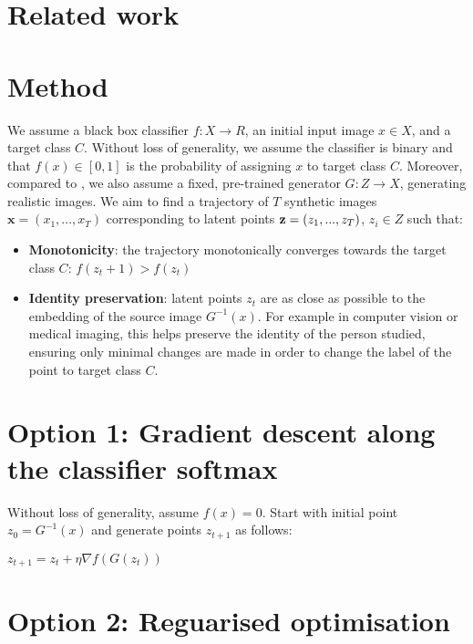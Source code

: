 \documentclass{article}
\begin{document}
\section{Related work}

% 
% 

\section{Method}


We assume a black box classifier $f: X \to R$, an initial input image $x \in X$, and a target class $C$. Without loss of generality, we assume the classifier is binary and that $f(x) \in [0,1]$ is the probability of assigning $x$ to target class $C$. Moreover, compared to \cite{singla2019explanation}, we also assume a fixed, pre-trained generator $G: Z \to X$, generating realistic images. We aim to find a trajectory of $T$ synthetic images $\textbf{x} = (x_1, ..., x_T)$ corresponding to latent points $\textbf{z} = (z_1, ..., z_T)$, $z_i \in Z$ such that:
\begin{itemize}
 \item \textbf{Monotonicity}: the trajectory monotonically converges towards the target class $C$: $f(z_t+1) > f(z_{t})$
 \item \textbf{Identity preservation}: latent points $z_t$ are as close as possible to the embedding of the source image $G^{-1}(x)$. For example in computer vision or medical imaging, this helps preserve the identity of the person studied, ensuring only minimal changes are made in order to change the label of the point to target class $C$.
\end{itemize}


\section{Option 1: Gradient descent along the classifier softmax}

Without loss of generality, assume $f(x) = 0$. Start with initial point $z_0 = G^{-1}(x)$ and generate points $z_{t+1}$ as follows:

$z_{t+1} = z_t + \eta \nabla f(G(z_t))$


\section{Option 2: Reguarised optimisation}
\end{document}

